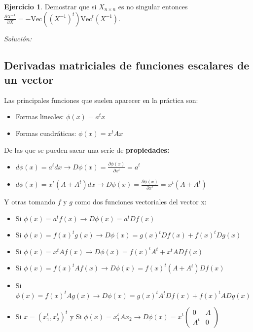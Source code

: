 \documentclass{article}
\theoremstyle{theorem-style}  %
\theoremstyle{definition}
\theoremstyle{example-style}
\newtheorem{exercise}{Ejercicio}[section]
\begin{document}
\begin{exercise}
	Demostrar que si $X_{n\times n}$ es no singular entonces $\displaystyle \frac{\partial X^{-1}}{\partial X} = -\text{Vec}((X^{-1})^t)\text{Vec}^t(X^{-1})$.
\end{exercise}
\textit{Solución:}

\subsection{Derivadas matriciales de funciones escalares de un vector}

Las principales funciones que suelen aparecer en la práctica son:

\begin{itemize}
	\item Formas lineales: $\phi(x)=a^tx$
	\item Formas cuadráticas: $\phi(x)=x^tAx$
\end{itemize}

De las que se pueden sacar una serie de \textbf{propiedades:}

\begin{itemize}
	\item $d\phi(x) = a^tdx \rightarrow D\phi(x) = \frac{\partial \phi(x)}{\partial x^t} = a^t$
	\item $d\phi(x) = x^t(A+A^t)dx \rightarrow D\phi(x) = \frac{\partial \phi(x)}{\partial x^t} = x^t(A+A^t)$
	
\end{itemize}

Y otras tomando $f$ y $g$ como dos funciones vectoriales del vector x:

\begin{itemize}
	\item Si $\phi(x) = a^tf(x) \rightarrow D\phi(x) = a^tDf(x)$
	\item  Si $\phi(x) = f(x)^tg(x) \rightarrow D\phi(x) = g(x)^tDf(x)+ f(x)^tDg(x)$
	\item Si $\phi(x) = x^tAf(x) \rightarrow D\phi(x) = f(x)^t A^t + x^tADf(x)$
	\item Si $\phi(x) = f(x)^tAf(x) \rightarrow D\phi(x) = f(x)^t(A+A^t)Df(x)$
	\item Si $\phi(x) = f(x)^tAg(x) \rightarrow D\phi(x) = g(x)^tA^tDf(x)+ f(x)^tADg(x)$
	\item Si $x=(x_1^t,x_2^t)^t$ y Si $\phi(x) = x_1^tAx_2 \rightarrow D\phi(x) = x^t (\begin{array}{cc}
	0 & A\\
	A^t  & 0
	\end{array})$ 
\end{itemize}
	
\end{document}
